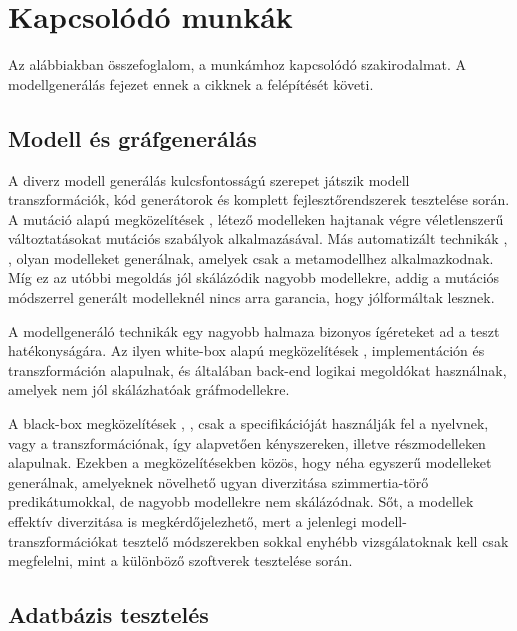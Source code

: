 \chapter{Kapcsolódó munkák}
\label{chp:6}

Az alábbiakban összefoglalom, a munkámhoz kapcsolódó szakirodalmat. A modellgenerálás fejezet ennek \cite{semerath2018iterative} a cikknek a felépítését követi.  

\section{Modell és gráfgenerálás}

A diverz modell generálás kulcsfontosságú szerepet játszik modell transzformációk, kód generátorok és komplett fejlesztőrendszerek tesztelése során. A mutáció alapú megközelítések \cite{aranega2015towards}, \cite{darabos2008towards}  létező modelleken hajtanak végre véletlenszerű változtatásokat mutációs szabályok alkalmazásával. Más automatizált technikák  \cite{brottier2006metamodel}, \cite{ehrig2009generating}, olyan modelleket generálnak, amelyek csak a metamodellhez alkalmazkodnak. Míg ez  az utóbbi megoldás jól skálázódik nagyobb modellekre, addig a mutációs módszerrel generált modelleknél nincs arra  garancia, hogy jólformáltak lesznek.

A modellgeneráló technikák egy nagyobb halmaza bizonyos ígéreteket ad a teszt hatékonyságára. Az ilyen white-box alapú megközelítések \cite{aranega2015towards}, \cite{bordbar2005uml2alloy} implementáción és transzformáción alapulnak, és általában back-end logikai megoldókat használnak, amelyek nem jól skálázhatóak gráfmodellekre.

A black-box megközelítések \cite{buttner2012verification}, \cite{fleurey2007towards}, csak a specifikációját használják fel a nyelvnek, vagy a transzformációnak, így alapvetően  kényszereken, illetve részmodelleken alapulnak. Ezekben a megközelítésekben közös, hogy néha egyszerű modelleket generálnak, amelyeknek   növelhető ugyan diverzitása szimmertia-törő predikátumokkal, de nagyobb modellekre nem skálázódnak. Sőt,  a modellek effektív diverzitása is megkérdőjelezhető, mert a jelenlegi modell- transzformációkat tesztelő módszerekben sokkal enyhébb vizsgálatoknak kell csak megfelelni, mint a különböző szoftverek tesztelése során.

\section{Adatbázis tesztelés}

